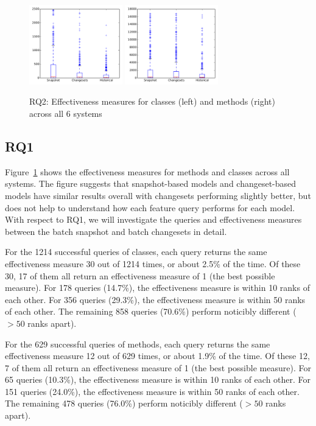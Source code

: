 \begin{figure}[t]
\centering
\includegraphics[width=0.36\textwidth]{figures/rq2-overall-class}
\includegraphics[width=0.36\textwidth]{figures/rq2-overall-method}
\caption{RQ2: Effectiveness measures for classes (left) and methods (right) across all 6 systems}
\label{fig:em}
\end{figure}

\subsection{RQ1}

Figure~\ref{fig:em} shows the effectiveness measures for methods and classes
across all systems. The figure suggests that snapshot-based models and
changeset-based models have similar results overall with changesets performing
slightly better, but does not help to understand how each feature query performs
for each model.  With respect to RQ1, we will investigate the queries and
effectiveness measures between the batch snapshot and batch changesets in
detail.


For the 1214 successful queries of classes,
each query returns the same effectiveness measure 30 out of 1214 times, or about 2.5\% of the time.
Of these 30, 17 of them all return an effectiveness measure of 1 (the best possible measure).
For 178 queries (14.7\%), the effectiveness measure is within 10 ranks of each other.
For 356 queries (29.3\%), the effectiveness measure is within 50 ranks of each other.
The remaining 858 queries (70.6\%) perform noticibly different ($> 50$ ranks apart).

For the 629 successful queries of methods,
each query returns the same effectiveness measure 12 out of 629 times, or about 1.9\% of the time.
Of these 12, 7 of them all return an effectiveness measure of 1 (the best possible measure).
For 65 queries (10.3\%), the effectiveness measure is within 10 ranks of each other.
For 151 queries (24.0\%), the effectiveness measure is within 50 ranks of each other.
The remaining 478 queries (76.0\%) perform noticibly different ($> 50$ ranks apart).

